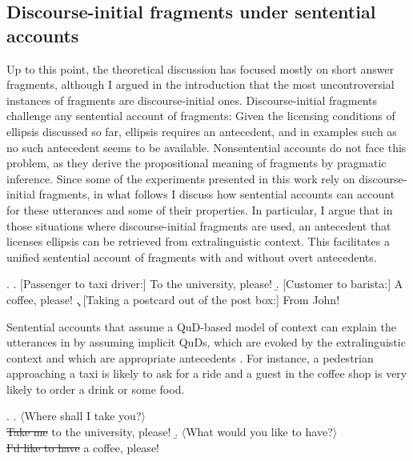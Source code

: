 \subsection{Discourse-initial fragments under sentential accounts} \label{sec:theories-initial}

Up to this point, the theoretical discussion has focused mostly on short answer fragments, although I argued in the introduction that the most uncontroversial instances of fragments are discourse-initial ones. Discourse-initial fragments challenge any sentential account of fragments: Given the licensing conditions of ellipsis discussed so far, ellipsis requires an antecedent, and in examples such as \Next no such antecedent seems to be available. Nonsentential accounts do not face this problem, as they derive the propositional meaning of fragments by pragmatic inference. Since some of the experiments presented in this work rely on discourse-initial fragments, in what follows I discuss how sentential accounts can account for these utterances and some of their properties. In particular, I argue that in those situations where discourse-initial fragments are used, an antecedent that licenses ellipsis can be retrieved from extralinguistic context. This facilitates a unified sentential account of fragments with and without overt antecedents. 

\ex. \label{ex:fragments-dilang}
\a. [Passenger to taxi driver:] To the university, please! \label{ex:fragments-dilang-uni}
\b. [Customer to barista:] A coffee, please! \label{ex:fragments-dilang-coffee}
\c. [Taking a postcard out of the post box:] From John!\label{ex:fragments-dilang-letter}

Sentential accounts that assume a QuD-based model of context \citep{reich2007, weir2014} can explain the utterances in \Last by assuming implicit QuDs, which are evoked by the extralinguistic context and which are appropriate antecedents \Next. For instance, a pedestrian approaching a taxi is likely to ask for a ride and a guest in the coffee shop is very likely to order a drink or some food. 

\ex.  
\a. $\langle$Where shall I take you?$\rangle$\label{ex:uni-taxi-qud}\\
	   \sout{Take me} to the university, please!
     \b. $\langle$What would you like to have?$\rangle$\\
	   \sout{I'd like to have} a coffee, please!
	   
